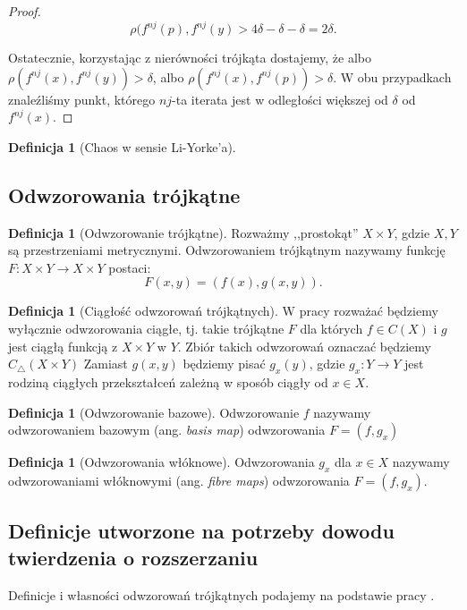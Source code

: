 \documentclass[licencjacka]{pwr_wmat_praca_dyplomowa}
\theoremstyle{plain}
\numberwithin{theorem}{chapter}
\theoremstyle{definition}
\numberwithin{theorem}{chapter}
\newtheorem{definition}[theorem]{Definicja}
\begin{document}
\begin{proof}
$$\rho(f^{nj}(p), f^{nj}(y) > 4\delta - \delta - \delta = 2\delta.$$

Ostatecznie, korzystając z nierówności trójkąta dostajemy, że albo $\rho(f^{nj}(x), f^{nj}(y)) > \delta$, albo $\rho(f^{nj}(x), f^{nj}(p)) > \delta.$ W obu przypadkach znaleźliśmy punkt, którego $nj$-ta iterata jest w odległości większej od $\delta$ od $f^{nj}(x).$
\end{proof}



\begin{definition}[Chaos w sensie Li-Yorke'a]
\end{definition}



\subsection{Odwzorowania trójkątne}


\begin{definition}[Odwzorowanie trójkątne]
Rozważmy ,,prostokąt'' $X \times Y$, gdzie $X, Y$ są przestrzeniami metrycznymi. 
Odwzorowaniem trójkątnym nazywamy funkcję $F: X \times Y \rightarrow X \times Y$ postaci:
$$F(x,y) = (f(x), g(x,y)).$$
\end{definition}


\begin{definition}[Ciągłość odwzorowań trójkątnych]
W pracy rozważać będziemy wyłącznie odwzorowania ciągłe, tj. takie trójkątne $F$ dla których $f \in C(X)$ i $g$ jest ciągłą funkcją z $X \times Y$ w $Y$. 
Zbiór takich odwzorowań oznaczać będziemy $C_\triangle(X \times Y)$
Zamiast $g(x, y)$ będziemy pisać $g_x(y)$, gdzie $g_x: Y \rightarrow Y$ jest rodziną ciągłych przekształceń zależną w sposób ciągły od $x \in X$.
\end{definition}

\begin{definition}[Odwzorowanie bazowe]
Odwzorowanie $f$ nazywamy odwzorowaniem bazowym (ang. \textit{basis map}) odwzorowania $F = (f, g_x)$
\end{definition}

\begin{definition}[Odwzorowania włóknowe]
Odwzorowania $g_x$ dla $x \in X$ nazywamy odwzorowaniami włóknowymi (ang. \textit{fibre maps}) odwzorowania $F = (f, g_x)$.
\end{definition}



\subsection{Definicje utworzone na potrzeby dowodu twierdzenia o rozszerzaniu}
Definicje i własności odwzorowań trójkątnych podajemy na podstawie pracy \cite{balibrea2003topological}.
\end{document}
